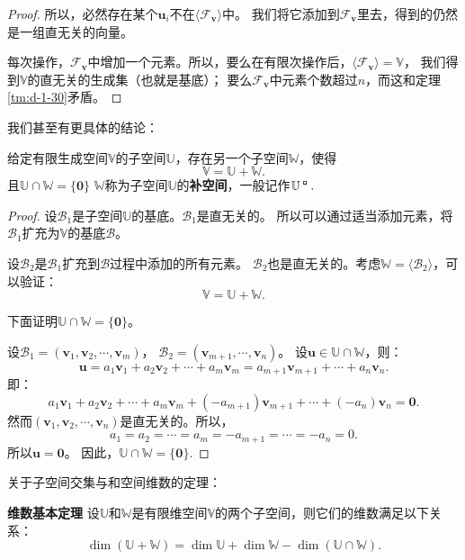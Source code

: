\documentclass[12pt,UTF8]{ctexbook}
\begin{document}
\begin{appendix}
\begin{proof}
    所以，必然存在某个$\mathbf{u}_i$不在$\langle\mathcal{F}_{\mathbf{v}}\rangle$中。
    我们将它添加到$\mathcal{F}_{\mathbf{v}}$里去，得到的仍然是一组直无关的向量。

    每次操作，$\mathcal{F}_{\mathbf{v}}$中增加一个元素。所以，要么在有限次操作后，$\langle\mathcal{F}_{\mathbf{v}}\rangle = \mathbb{V}$，
    我们得到$\mathbb{V}$的直无关的生成集（也就是基底）；
    要么$\mathcal{F}_{\mathbf{v}}$中元素个数超过$n$，而这和定理\ref{tm:d-1-30}矛盾。

\end{proof}

我们甚至有更具体的结论：
\begin{tm}\label{tm:d-1-70}
    给定有限生成空间$\mathbb{V}$的子空间$\mathbb{U}$，存在另一个子空间$\mathbb{W}$，使得
    $$ \mathbb{V} = \mathbb{U} + \mathbb{W}.$$
    且$\mathbb{U} \cap \mathbb{W} = \{\mathbf{0}\}$
    $\mathbb{W}$称为子空间$\mathbb{U}$的\textbf{补空间}，一般记作$\mathbb{U}^{\bu}.$
\end{tm}

\begin{proof}
    设$\mathcal{B}_1$是子空间$\mathbb{U}$的基底。$\mathcal{B}_1$是直无关的。
    所以可以通过适当添加元素，将$\mathcal{B}_1$扩充为$\mathbb{V}$的基底$\mathcal{B}$。

    设$\mathcal{B}_2$是$\mathcal{B}_1$扩充到$\mathcal{B}$过程中添加的所有元素。
    $\mathcal{B}_2$也是直无关的。考虑$\mathbb{W} = \langle\mathcal{B}_2\rangle$，可以验证：
    $$ \mathbb{V} = \mathbb{U} + \mathbb{W}.$$

    下面证明$ \mathbb{U} \cap \mathbb{W} = \{\mathbf{0}\}$。

    设$\mathcal{B}_1 = (\mathbf{v}_1, \mathbf{v}_2, \cdots , \mathbf{v}_m )$，
    $\mathcal{B}_2 = (\mathbf{v}_{m+1}, \cdots , \mathbf{v}_n )$。 
    设$ \mathbf{u} \in \mathbb{U} \cap \mathbb{W}$，则：
    $$ \mathbf{u} = a_1\mathbf{v}_1 + a_2\mathbf{v}_2 + \cdots + a_m\mathbf{v}_m = a_{m+1}\mathbf{v}_{m+1} + \cdots + a_n\mathbf{v}_n. $$
    即：
    $$a_1\mathbf{v}_1 + a_2\mathbf{v}_2 + \cdots + a_m\mathbf{v}_m + (-a_{m+1})\mathbf{v}_{m+1} + \cdots + (-a_{n})\mathbf{v}_{n} = \mathbf{0}. $$
    然而$(\mathbf{v}_1, \mathbf{v}_2, \cdots , \mathbf{v}_n )$是直无关的。所以，
    $$ a_1 = a_2 = \cdots = a_m = -a_{m+1} = \cdots = -a_n = 0.$$
    所以$\mathbf{u} = \mathbf{0}$。
    因此，$ \mathbb{U} \cap \mathbb{W} = \{\mathbf{0}\}$.

\end{proof}

关于子空间交集与和空间维数的定理：
\begin{tm}{\textbf{维数基本定理}}\label{tm:d-1-80}
    设$\mathbb{U}$和$\mathbb{W}$是有限维空间$\mathbb{V}$的两个子空间，则它们的维数满足以下关系：
    $$ \dim (\mathbb{U} + \mathbb{W}) = \dim \mathbb{U} + \dim \mathbb{W} - \dim (\mathbb{U} \cap \mathbb{W}).$$
\end{tm}


\end{appendix}
\end{document}
